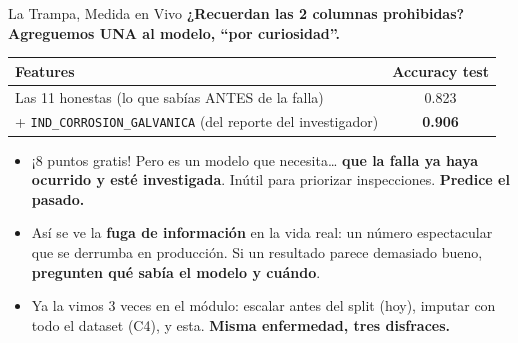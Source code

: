 \documentclass[aspectratio=169, 11pt]{beamer}
\begin{document}
\begin{frame}[shrink=10]{La Trampa, Medida en Vivo}
  \vspace{-4pt}
  {\small\color{arcaDark}\bfseries
    ¿Recuerdan las 2 columnas prohibidas? Agreguemos UNA al modelo, ``por curiosidad''.}

  \vspace{10pt}
  \centering
  {\footnotesize
  \begin{tabular}{@{}lc@{}}
    \toprule
    {\color{arcaDark}\bfseries Features} & {\color{arcaDark}\bfseries Accuracy test} \\
    \midrule
    Las 11 honestas (lo que sabías ANTES de la falla) & 0.823 \\
    \rowcolor{arcaGray}
    + \texttt{IND\_CORROSION\_GALVANICA} (del reporte del investigador)
      & {\color{arcaRed}\bfseries 0.906} \\
    \bottomrule
  \end{tabular}
  }

  \vspace{12pt}
  {\footnotesize\color{textMuted}
  \begin{itemize}\setlength{\itemsep}{4pt}
    \item[{\color{arcaRed}\scriptsize\faExclamationTriangle}]
      ¡8 puntos gratis! Pero es un modelo que necesita\ldots{}
      \textbf{que la falla ya haya ocurrido y esté investigada}.
      Inútil para priorizar inspecciones. \textbf{Predice el pasado.}
    \item[{\color{arcaRed}\scriptsize\faBan}]
      Así se ve la \textbf{fuga de información} en la vida real: un número
      espectacular que se derrumba en producción. Si un resultado parece
      demasiado bueno, \textbf{pregunten qué sabía el modelo y cuándo}.
    \item[{\color{codeGreen}\scriptsize\faCheck}]
      Ya la vimos 3 veces en el módulo: escalar antes del split (hoy),
      imputar con todo el dataset (C4), y esta. \textbf{Misma enfermedad,
      tres disfraces.}
  \end{itemize}
  }
\end{frame}
\end{document}
